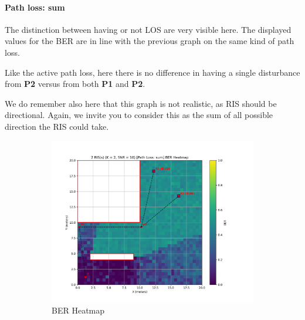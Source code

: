 \paragraph*{Path loss: sum}
The distinction between having or not LOS are very visible here. The displayed values for the BER are in line with the previous graph on the same kind of path loss.

Like the active path loss, here there is no difference in having a single disturbance from \textbf{P2} versus from both \textbf{P1} and \textbf{P2}.

We do remember also here that this graph is not realistic, as RIS should be directional. Again, we invite you to consider this as the sum of all possible direction the RIS could take.

\begin{figure}[H]
  \centering
  \begin{subfigure}[b]{0.48\textwidth}
    \centering
    \includegraphics[width=\textwidth]{imgs/heatmap-simulations/2 RIS(s) (K = 2, SNR = 10) [Path Loss_ sum] BER Heatmap.png}
    \caption{BER Heatmap}
  \end{subfigure}
  \hfill
  \begin{subfigure}[b]{0.48\textwidth}
    \centering

\end{subfigure}
\end{figure}
